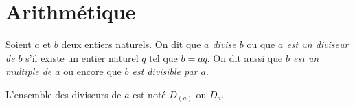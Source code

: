
\TCDLessonStyleOn
\providecommand{\congru}[3]{#1 \equiv #2 \quad \mathrm{mod}\ #3}

\chapter{Arithm\'etique}
\begin{defi}[Divisibilit\'e] 
Soient $a$ et $b$ deux entiers naturels.
On dit que \emph{$a$ divise $b$} ou que \emph{$a$ est un diviseur de $b$} s'il existe un entier naturel $q$ tel que $b = aq$.
On dit aussi que \emph{$b$ est un multiple de $a$} ou encore que \emph{$b$ est divisible par $a$}.

L'ensemble des diviseurs de $a$ est not\'e $D_{(a)}$ ou $D_a$.
\end{defi}
